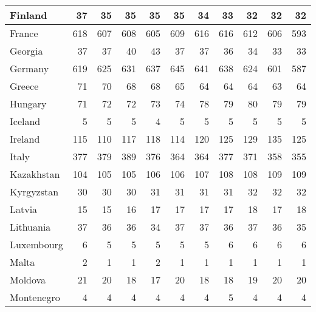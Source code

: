 \begin{table}
\begin{tabular}{|l|r|r|r|r|r|r|r|r|r|r|}
                       Finland&     37&     35&     35&     35&     35&     34&     33&     32&     32&     32\\\hline
                        France&    618&    607&    608&    605&    609&    616&    616&    612&    606&    593\\\hline
                       Georgia&     37&     37&     40&     43&     37&     37&     36&     34&     33&     33\\\hline
                       Germany&    619&    625&    631&    637&    645&    641&    638&    624&    601&    587\\\hline
                        Greece&     71&     70&     68&     68&     65&     64&     64&     64&     63&     64\\\hline
                       Hungary&     71&     72&     72&     73&     74&     78&     79&     80&     79&     79\\\hline
                       Iceland&      5&      5&      5&      4&      5&      5&      5&      5&      5&      5\\\hline
                       Ireland&    115&    110&    117&    118&    114&    120&    125&    129&    135&    125\\\hline
                         Italy&    377&    379&    389&    376&    364&    364&    377&    371&    358&    355\\\hline
                    Kazakhstan&    104&    105&    105&    106&    106&    107&    108&    108&    109&    109\\\hline
                    Kyrgyzstan&     30&     30&     30&     31&     31&     31&     31&     32&     32&     32\\\hline
                        Latvia&     15&     15&     16&     17&     17&     17&     17&     18&     17&     18\\\hline
                     Lithuania&     37&     36&     36&     34&     37&     37&     36&     37&     36&     35\\\hline
                    Luxembourg&      6&      5&      5&      5&      5&      5&      6&      6&      6&      6\\\hline
                         Malta&      2&      1&      1&      2&      1&      1&      1&      1&      1&      1\\\hline
                       Moldova&     21&     20&     18&     17&     20&     18&     18&     19&     20&     20\\\hline
                    Montenegro&      4&      4&      4&      4&      4&      4&      5&      4&      4&      4\\\hline

\end{tabular}
\end{table}
